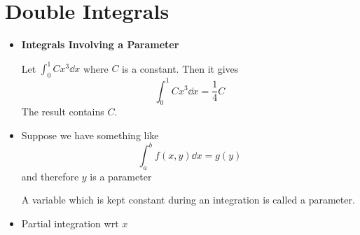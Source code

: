 \section{Double Integrals}
\begin{itemize}
    \item \textbf{Integrals Involving a Parameter}
          \begin{example}
              Let $\int_0^1 Cx^3 \dd{x}$ where $C$ is a constant. Then it gives
              \begin{equation}
                  \int_0^1 Cx^3 \dd{x} = \frac{1}{4}C
              \end{equation}
              The result contains $C$.
          \end{example}
    \item Suppose we have something like
          \begin{equation}
              \int_a^b f(x,y) \dd{x} = g(y)
          \end{equation}
          and therefore $y$ is a parameter
          \begin{definition}
              A variable which is kept constant during an integration is called a parameter.
          \end{definition}
    \item         Partial integration wrt $x$


\end{itemize}
